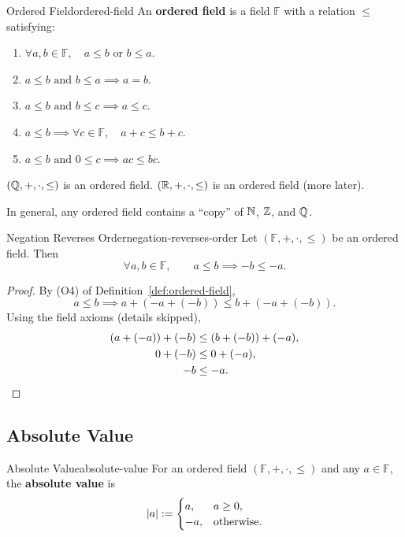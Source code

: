 \begin{definition}{Ordered Field}{ordered-field}
  An \textbf{ordered field} is a field $\mathbb{F}$ with a relation $\le$ satisfying:
  \begin{enumerate}[leftmargin=3em]
    \item[(O1)] $\forall a,b\in\mathbb{F},\quad a\le b\text{ or }b\le a$.
    \item[(O2)] $a\le b\text{ and }b\le a\implies a=b$.
    \item[(O3)] $a\le b\text{ and }b\le c\implies a\le c$.
    \item[(O4)] $a\le b\implies\forall c\in\mathbb{F},\quad a+c\le b+c$.
    \item[(O5)] $a\le b\text{ and }0\le c\implies ac\le bc$.
  \end{enumerate}
\end{definition}

\begin{example}
  $(\mathbb{Q},+,\cdot,\le)$ is an ordered field.
  $(\mathbb{R},+,\cdot,\le)$ is an ordered field (more later).
\end{example}

In general, any ordered field contains a ``copy'' of $\mathbb{N}$, $\mathbb{Z}$, and $\mathbb{Q}$.

\begin{theorem}{Negation Reverses Order}{negation-reverses-order}
  Let $(\mathbb{F},+,\cdot,\le)$ be an ordered field. Then
  \[
    \forall a,b\in\mathbb{F},\qquad a\le b\implies -b\le-a.
  \]
\end{theorem}

\begin{proof}
  By (O4) of Definition~\ref{def:ordered-field},
  \[
    a\le b\implies a+(-a+(-b))\le b+(-a+(-b)).
  \]
  Using the field axioms (details skipped),
  \begin{align*}
    (a+(-a))+(-b) & \le(b+(-b))+(-a), \\
    0+(-b)        & \le0+(-a),        \\
    -b            & \le-a.\qedhere
  \end{align*}
\end{proof}

\subsection{Absolute Value}

\begin{definition}{Absolute Value}{absolute-value}
  For an ordered field $(\mathbb{F},+,\cdot,\le)$ and any $a\in\mathbb{F}$, the \textbf{absolute value} is
  \[
    \left\lvert a \right\rvert:=
    \begin{cases}
      a,  & a\ge0,            \\
      -a, & \text{otherwise}.
    \end{cases}
  \]
\end{definition}

